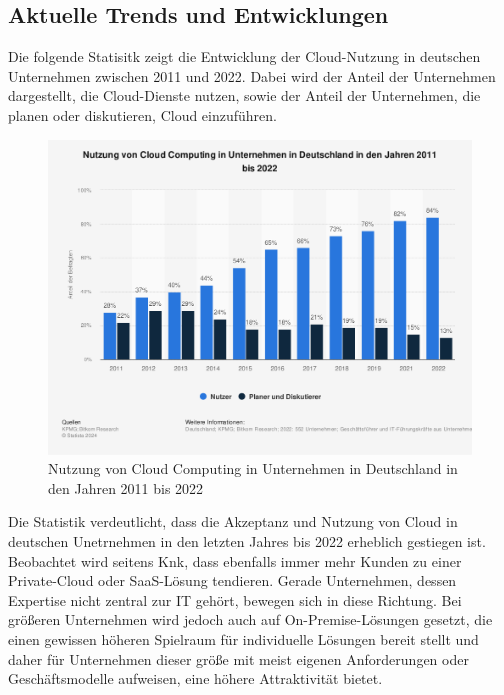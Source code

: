 \documentclass[12pt,bibtotoc]{article}
\begin{document}
			\subsection{Aktuelle Trends und Entwicklungen}
			Die folgende Statisitk zeigt die Entwicklung der Cloud-Nutzung in deutschen Unternehmen zwischen 2011 und 2022.
			Dabei wird der Anteil der Unternehmen dargestellt, die Cloud-Dienste nutzen, sowie der Anteil der Unternehmen, die planen oder diskutieren, Cloud einzuführen. 
			\begin{figure}[H] %
				\centering
				\includegraphics[keepaspectratio,width=\textwidth,height=\textheight]{"Content/Pictures/Nutzung von Cloud Computing in Unternehmen in Deutschland in den Jahren 2011 bis 2022.png"} 
				\renewcommand{\figurename}{Abb.}
				\caption{\small Nutzung von Cloud Computing in Unternehmen in Deutschland in den Jahren 2011 bis 2022}
			\end{figure}
			Die Statistik verdeutlicht, dass die Akzeptanz und Nutzung von Cloud in deutschen Unetrnehmen in den letzten Jahres bis 2022 erheblich gestiegen ist. 
			Beobachtet wird seitens Knk, dass ebenfalls immer mehr Kunden zu einer Private-Cloud oder SaaS-Lösung tendieren. Gerade Unternehmen, dessen Expertise nicht zentral zur IT gehört, bewegen sich in diese Richtung.
			Bei größeren Unternehmen wird jedoch auch auf On-Premise-Lösungen gesetzt, die einen gewissen höheren Spielraum für individuelle Lösungen bereit stellt und daher für Unternehmen dieser größe mit meist eigenen Anforderungen oder Geschäftsmodelle aufweisen, eine höhere Attraktivität bietet. \cite{Anhang}
			\newpage
\end{document}

